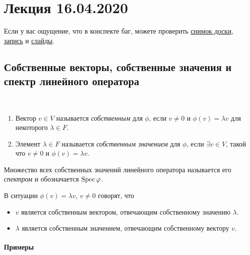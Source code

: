 \section{Лекция 16.04.2020} 

Если у вас ощущение, что в конспекте баг, можете проверить \href{https://www.dropbox.com/s/9ice7q309b19wga/LA_19-20_osn_Lecture28.svg?dl=0}{снимок доски}, \href{https://www.youtube.com/watch?v=Jey544KL9mQ&list=PLEwK9wdS5g0oP4vhnGvQHPSqshML3Ze4P}{запись} и \href{https://www.dropbox.com/s/y4e65rt245cvibz/LinOperators1.pdf?dl=0}{слайды}.

\subsection{Собственные векторы, собственные значения и спектр линейного оператора}

\begin{definition}~
    \begin{enumerate}
    \item Вектор $v \in V$ называется \textit{собственным} для $\phi$, если $v \neq 0$ и $\phi(v) = \lambda v$ для некоторого $\lambda \in F$.
    \item Элемент $\lambda \in F$ называется \textit{собственным значением} для $\phi$, если $\exists v \in V$, такой что $v \neq 0$ и $\phi(v) = \lambda v$.
    \end{enumerate}

    Множество всех собственных значений линейного оператора называется его \textit{спектром} и обозначается $\operatorname{\mathop{\mathrm{Spec}}} \varphi$.
\end{definition}

В ситуации $\phi(v) = \lambda v$, $v \neq 0$ говорят, что
\begin{itemize}[nosep]
\item $v$ является собственным вектором, отвечающим собственному значению $\lambda$.
\item $\lambda$ является собственным значением, отвечающим собственному вектору $v$.
\end{itemize}


\paragraph{Примеры}

